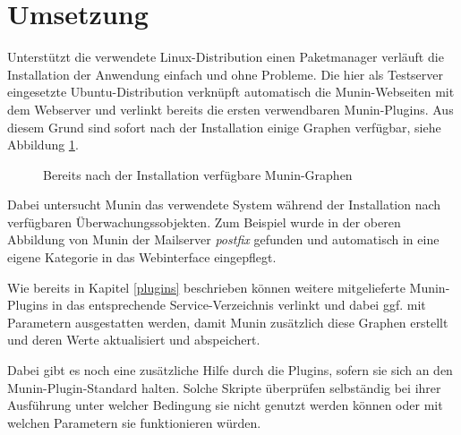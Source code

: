 \section{Umsetzung}
\label{umsetzung}
Unterstützt die verwendete Linux-Distribution einen Paketmanager verläuft die Installation der Anwendung einfach und ohne Probleme.
Die hier als Testserver eingesetzte Ubuntu-Distribution verknüpft automatisch die Munin-Webseiten mit dem Webserver und verlinkt bereits die ersten verwendbaren Munin-Plugins.
Aus diesem Grund sind sofort nach der Installation einige Graphen verfügbar, siehe Abbildung \ref{ootb}.

\begin{figure}[ht]
	\centering
		\caption{Bereits nach der Installation verfügbare Munin-Graphen}
		\label{ootb}
\end{figure}

Dabei untersucht Munin das verwendete System während der Installation nach verfügbaren Überwachungssobjekten.
Zum Beispiel wurde in der oberen Abbildung von Munin der Mailserver \textit{postfix} gefunden und automatisch in eine eigene Kategorie in das Webinterface eingepflegt.

Wie bereits in Kapitel \ref{plugins} beschrieben können weitere mitgelieferte Munin-Plugins in das entsprechende Service-Verzeichnis verlinkt und dabei ggf. mit Parametern ausgestatten werden, damit Munin zusätzlich diese Graphen erstellt und deren Werte aktualisiert und abspeichert.

Dabei gibt es noch eine zusätzliche Hilfe durch die Plugins, sofern sie sich an den Munin-Plugin-Standard halten.
Solche Skripte überprüfen selbständig bei ihrer Ausführung unter welcher Bedingung sie nicht genutzt werden können oder mit welchen Parametern sie funktionieren würden.

